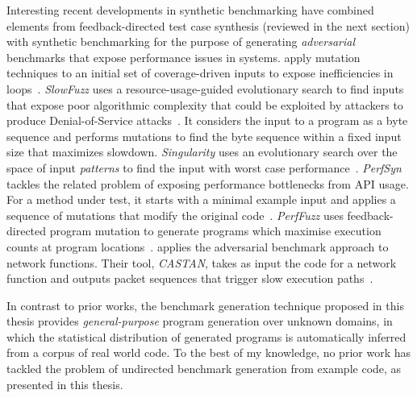 Interesting recent developments in synthetic benchmarking have combined elements from feedback-directed test case synthesis (reviewed in the next section) with synthetic benchmarking for the purpose of generating \emph{adversarial} benchmarks that expose performance issues in systems.
\citeauthor{Dhok2016} apply mutation techniques to an initial set of coverage-driven inputs to expose inefficiencies in loops~\cite{Dhok2016}.
\emph{SlowFuzz} uses a resource-usage-guided evolutionary search to find inputs that expose poor algorithmic complexity that could be exploited by attackers to produce Denial-of-Service attacks~\cite{Petsios2017}. It considers the input to a program as a byte sequence and performs mutations to find the byte sequence within a fixed input size that maximizes slowdown.
\emph{Singularity} uses an evolutionary search over the space of input \emph{patterns} to find the input with worst case performance~\cite{Wei2018}.
\emph{PerfSyn} tackles the related problem of exposing performance bottlenecks from API usage. For a method under test, it starts with a minimal example input and applies a sequence of mutations that modify the original code~\cite{Toffola2018}.
\emph{PerfFuzz} uses feedback-directed program mutation to generate programs which maximise execution counts at program locations~\cite{Lemieux2018}.
\citeauthor{Pedrosa2018} applies the adversarial benchmark approach to network functions. Their tool, \emph{CASTAN}, takes as input the code for a network function and outputs packet sequences that trigger slow execution paths~\cite{Pedrosa2018}.

In contrast to prior works, the benchmark generation technique proposed in this thesis provides \emph{general-purpose} program generation over unknown domains, in which the statistical distribution of generated programs is automatically inferred from a corpus of real world code. To the best of my knowledge, no prior work has tackled the problem of undirected benchmark generation from example code, as presented in this thesis.


